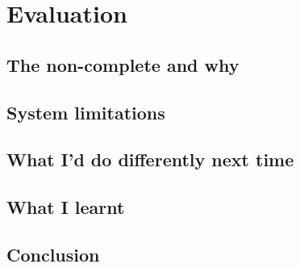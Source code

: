 \section{Evaluation}

\subsection{The non-complete and why}
\subsection{System limitations}
\subsection{What I'd do differently next time}
\subsection{What I learnt}
\subsection{Conclusion}
